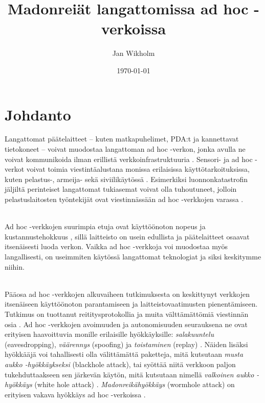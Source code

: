\documentclass[finnish]{tktltiki2}
\title{Madonreiät langattomissa ad hoc -verkoissa}
\author{Jan Wikholm}
\date{\today}
\theoremstyle{definition}
\theoremstyle{remark}
\begin{document}

\frontmatter      %

\maketitle        %
\makeabstract     %

\tableofcontents  %


\mainmatter       %

\section{Johdanto}



Langattomat päätelaitteet -- kuten matkapuhelimet, PDA:t ja kannettavat tietokoneet -- voivat muodostaa langattoman ad hoc -verkon, jonka avulla ne voivat kommunikoida ilman erillistä verkkoinfrastruktuuria \cite{delphi}. Sensori- ja ad hoc -verkot voivat toimia viestintäalustana monissa erilaisissa käyttötarkoituksissa, kuten pelastus-, armeija- \cite{leashes} sekä  siviilikäytössä \cite{liteworp}. Esimerkiksi luonnonkatastrofin jäljiltä perinteiset langattomat tukiasemat voivat olla tuhoutuneet, jolloin pelastuslaitosten työntekijät ovat viestinnässään ad hoc -verkkojen varassa \cite{leashes}.

\noindent \\
Ad hoc -verkkojen suurimpia etuja ovat käyttöönoton nopeus ja kustannustehokkuus \cite{delphi,leashes}, sillä laitteisto on usein edullista ja päätelaitteet osaavat itsenäisesti luoda verkon. Vaikka ad hoc -verkkoja voi muodostaa myös langallisesti, on useimmiten käytössä langattomat teknologiat \cite{leashes} ja siksi keskitymme niihin.

\noindent \\
Pääosa ad hoc -verkkojen alkuvaiheen tutkimuksesta on keskittynyt verkkojen itsenäiseen käyttöönoton parantamiseen ja laitteistovaatimusten pienentämiseen. Tutkimus on tuottanut reititysprotokollia ja muita välttämättömiä viestinnän osia \cite{liteworp}. Ad hoc -verkkojen avoimuuden ja autonomisuuden seurauksena ne ovat erityisen haavoittuvia monille erilaisille hyökkäyksille: \emph{salakuuntelu} (eavesdropping), \emph{väärennys} (spoofing) ja \emph{toistaminen} (replay) \cite{leashes}. Näiden lisäksi hyökkääjä voi tahallisesti olla välittämättä paketteja, mitä kutsutaan \emph{musta aukko -hyökkäykseksi} (blackhole attack), tai syöttää niitä verkkoon paljon tukehduttaakseen sen järkevän käytön, mitä kutsutaan nimellä \emph{valkoinen aukko -hyökkäys} (white hole attack) \cite{delphi}. \emph{Madonreikähyökkäys} (wormhole attack) on erityisen vakava hyökkäys ad hoc -verkoissa \cite{liteworp}.
\end{document}
